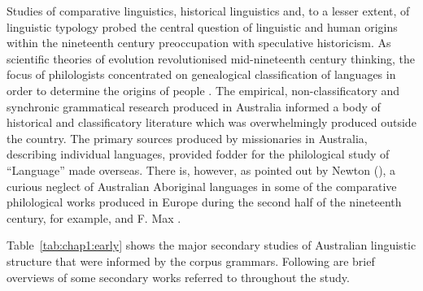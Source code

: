Studies of comparative linguistics, historical linguistics and, to a lesser extent, of linguistic typology probed the central question of linguistic and human origins within the nineteenth century preoccupation with speculative historicism. As scientific theories of evolution revolutionised mid-nineteenth century thinking, the focus of philologists concentrated on genealogical classification of languages in order to determine the origins of people \citep{gregorio_reflections_2002}. The empirical, non-classificatory and synchronic grammatical research produced in Australia informed a body of historical and classificatory literature which was overwhelmingly produced outside the country. The primary sources produced by missionaries in Australia, describing individual languages, provided fodder for the philological study of “Language” made overseas. There is, however, as pointed out by Newton (\citeyear[365--366]{newton_more_1987}), a curious neglect of Australian Aboriginal languages in some of the comparative philological works produced in Europe during the second half of the nineteenth century, for example, \citet{pott_einleitung_1884} and F. Max \citet{muller_lectures_1861}.

Table~\ref{tab:chap1:early} shows the major secondary studies of Australian linguistic structure that were informed by the corpus grammars. Following are brief overviews of some secondary works referred to throughout the study.

\begin{table}
    \caption{Secondary sources based on the corpus}
    \label{tab:1:2}
    \label{tab:chap1:early}
\end{table}


